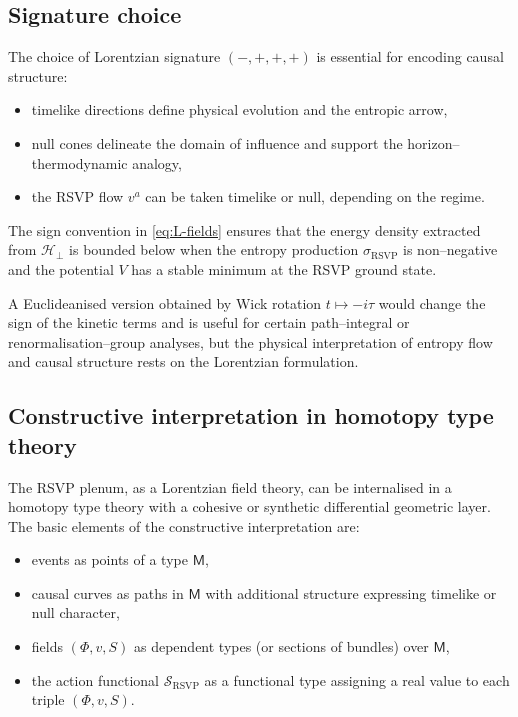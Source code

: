 \subsection{Signature choice}

The choice of Lorentzian signature $(-,+,+,+)$ is essential for encoding causal structure:
\begin{itemize}
  \item timelike directions define physical evolution and the entropic arrow,
  \item null cones delineate the domain of influence and support the horizon–thermodynamic analogy,
  \item the RSVP flow $v^a$ can be taken timelike or null, depending on the regime.
\end{itemize}

The sign convention in \eqref{eq:L-fields} ensures that the energy density extracted from $\mathcal{H}_\perp$ is bounded below when the entropy production $\sigma_{\mathrm{RSVP}}$ is non–negative and the potential $V$ has a stable minimum at the RSVP ground state.

A Euclideanised version obtained by Wick rotation $t\mapsto -i\tau$ would change the sign of the kinetic terms and is useful for certain path–integral or renormalisation–group analyses, but the physical interpretation of entropy flow and causal structure rests on the Lorentzian formulation.

\subsection{Constructive interpretation in homotopy type theory}

The RSVP plenum, as a Lorentzian field theory, can be internalised in a homotopy type theory with a cohesive or synthetic differential geometric layer. The basic elements of the constructive interpretation are:
\begin{itemize}
  \item events as points of a type $\mathsf{M}$,
  \item causal curves as paths in $\mathsf{M}$ with additional structure expressing timelike or null character,
  \item fields $(\Phi,v,S)$ as dependent types (or sections of bundles) over $\mathsf{M}$,
  \item the action functional $\mathcal{S}_{\mathrm{RSVP}}$ as a functional type assigning a real value to each triple $(\Phi,v,S)$.
\end{itemize}

